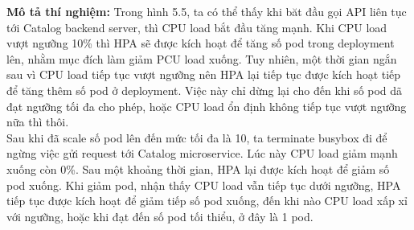 \textbf{Mô tả thí nghiệm:} Trong hình 5.5, ta có thể thấy khi băt đầu gọi API liên tục tới Catalog backend server, thì CPU load bắt đầu tăng mạnh. Khi CPU load vượt ngưỡng 10\% thì HPA sẽ được kích hoạt để tăng số pod trong deployment lên, nhằm mục đích làm giảm PCU load xuống. Tuy nhiên, một thời gian ngắn sau vì CPU load tiếp tục vượt ngưỡng nên HPA lại tiếp tục được kích hoạt tiếp để tăng thêm số pod ở deployment. Việc này chỉ dừng lại cho đến khi số pod dã đạt ngưỡng tối đa cho phép, hoặc CPU load ổn định không tiếp tục vượt ngưỡng nữa thì thôi.\\[0.5cm]
Sau khi đã scale số pod lên đến mức tối đa là 10, ta terminate busybox đi để ngừng việc gửi request tới Catalog microservice. Lúc này CPU load giảm mạnh xuống còn 0\%. Sau một khoảng thời gian, HPA lại được kích hoạt để giảm số pod xuống. Khi giảm pod, nhận thấy CPU load vẫn tiếp tục dưới ngưỡng, HPA tiếp tục được kích hoạt để giảm tiếp số pod xuống, đến khi nào CPU load xấp xỉ với ngưỡng, hoặc khi đạt đến số pod tối thiểu, ở đây là 1 pod.